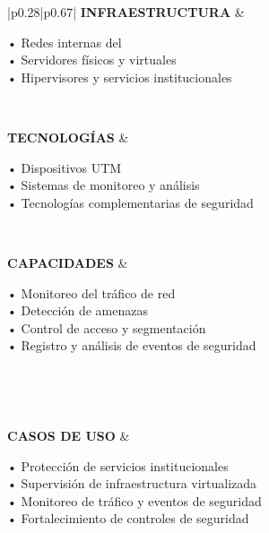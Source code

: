 \begin{table}[H]
\begin{tabular}{|p{0.28\textwidth}|p{0.67\textwidth}|}
		\textbf{INFRAESTRUCTURA} &
		\begin{minipage}[t]{\linewidth}
			\vspace{2pt}
			• Redes internas del \GRID \\ 
			• Servidores físicos y virtuales \\ 
			• Hipervisores y servicios institucionales
			\vspace{2pt}
		\end{minipage} \\ \hline
		
		\textbf{TECNOLOGÍAS} &
		\begin{minipage}[t]{\linewidth}
			\vspace{2pt}
			• Dispositivos UTM \\ 
			• Sistemas de monitoreo y análisis \\ 
			• Tecnologías complementarias de seguridad
			\vspace{2pt}
		\end{minipage} \\ \hline
		
		\textbf{CAPACIDADES} &
		\begin{minipage}[t]{\linewidth}
			\vspace{2pt}
			• Monitoreo del tráfico de red \\ 
			• Detección de amenazas \\ 
			• Control de acceso y segmentación \\ 
			• Registro y análisis de eventos de seguridad
			\vspace{2pt}
		\end{minipage} \\ \hline
		
		  \\ \hline
		
		\textbf{CASOS DE USO} &
		\begin{minipage}[t]{\linewidth}
			\vspace{2pt}
			• Protección de servicios institucionales \\ 
			• Supervisión de infraestructura virtualizada \\ 
			• Monitoreo de tráfico y eventos de seguridad \\ 
			• Fortalecimiento de controles de seguridad
			\vspace{2pt}
		\end{minipage} \\ \hline
		

\end{tabular}
\end{table}
